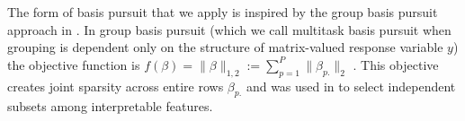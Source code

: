 The form of basis pursuit that we apply is inspired by the group basis pursuit approach in \citet{Koelle2022-ju}.
In group basis pursuit (which we call multitask basis pursuit when grouping is dependent only on the structure of matrix-valued response variable $y$) the objective function is $f(\beta) = \|\beta\|_{1,2} := \sum_{p=1}^P \|\beta_{p.}\|_2$  \citep{Yuan2006-bt, Obozinski2006-kq, Yeung2011-fg}.
This objective creates joint sparsity across entire rows $\beta_{p.}$ and was used in \citet{Koelle2022-ju} to select independent subsets among interpretable features.